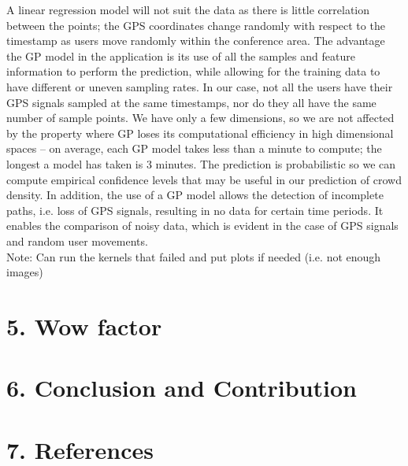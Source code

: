 \documentclass[letterpaper]{article}
\begin{document}
A linear regression model will not suit the data as there is little correlation between the points; the GPS coordinates change randomly with respect to the timestamp as users move randomly within the conference area. The advantage the GP model in the application is its use of all the samples and feature information to perform the prediction, while allowing for the training data to have different or uneven sampling rates. In our case, not all the users have their GPS signals sampled at the same timestamps, nor do they all have the same number of sample points. We have only a few dimensions, so we are not affected by the property where GP loses its computational efficiency in high dimensional spaces -- on average, each GP model takes less than a minute to compute; the longest a model has taken is 3 minutes. The prediction is probabilistic so we can compute empirical confidence levels that may be useful in our prediction of crowd density. In addition, the use of a GP model allows the detection of incomplete paths, i.e. loss of GPS signals, resulting in no data for certain time periods. It enables the comparison of noisy data, which is evident in the case of GPS signals and random user movements.
\\

Note: Can run the kernels that failed and put plots if needed (i.e. not enough images)

\section{5.  Wow factor}

\section{6.  Conclusion and Contribution}

\section{7.  References}
\end{document}
